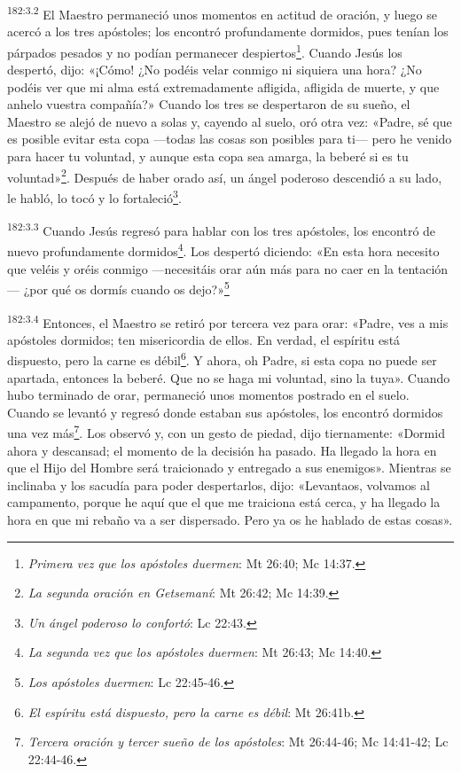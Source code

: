 \par
\textsuperscript{182:3.2} El Maestro permaneció unos momentos en actitud de oración, y luego se acercó a los tres apóstoles; los encontró profundamente dormidos, pues tenían los párpados pesados y no podían permanecer despiertos\footnote{\textit{Primera vez que los apóstoles duermen}: Mt 26:40; Mc 14:37.}. Cuando Jesús los despertó, dijo: «¡Cómo! ¿No podéis velar conmigo ni siquiera una hora? ¿No podéis ver que mi alma está extremadamente afligida, afligida de muerte, y que anhelo vuestra compañía?» Cuando los tres se despertaron de su sueño, el Maestro se alejó de nuevo a solas y, cayendo al suelo, oró otra vez: «Padre, sé que es posible evitar esta copa ---todas las cosas son posibles para ti--- pero he venido para hacer tu voluntad, y aunque esta copa sea amarga, la beberé si es tu voluntad»\footnote{\textit{La segunda oración en Getsemaní}: Mt 26:42; Mc 14:39.}. Después de haber orado así, un ángel poderoso descendió a su lado, le habló, lo tocó y lo fortaleció\footnote{\textit{Un ángel poderoso lo confortó}: Lc 22:43.}.

\par
\textsuperscript{182:3.3} Cuando Jesús regresó para hablar con los tres apóstoles, los encontró de nuevo profundamente dormidos\footnote{\textit{La segunda vez que los apóstoles duermen}: Mt 26:43; Mc 14:40.}. Los despertó diciendo: «En esta hora necesito que veléis y oréis conmigo ---necesitáis orar aún más para no caer en la tentación--- ¿por qué os dormís cuando os dejo?»\footnote{\textit{Los apóstoles duermen}: Lc 22:45-46.}

\par
\textsuperscript{182:3.4} Entonces, el Maestro se retiró por tercera vez para orar: «Padre, ves a mis apóstoles dormidos; ten misericordia de ellos. En verdad, el espíritu está dispuesto, pero la carne es débil\footnote{\textit{El espíritu está dispuesto, pero la carne es débil}: Mt 26:41b.}. Y ahora, oh Padre, si esta copa no puede ser apartada, entonces la beberé. Que no se haga mi voluntad, sino la tuya». Cuando hubo terminado de orar, permaneció unos momentos postrado en el suelo. Cuando se levantó y regresó donde estaban sus apóstoles, los encontró dormidos una vez más\footnote{\textit{Tercera oración y tercer sueño de los apóstoles}: Mt 26:44-46; Mc 14:41-42; Lc 22:44-46.}. Los observó y, con un gesto de piedad, dijo tiernamente: «Dormid ahora y descansad; el momento de la decisión ha pasado. Ha llegado la hora en que el Hijo del Hombre será traicionado y entregado a sus enemigos». Mientras se inclinaba y los sacudía para poder despertarlos, dijo: «Levantaos, volvamos al campamento, porque he aquí que el que me traiciona está cerca, y ha llegado la hora en que mi rebaño va a ser dispersado. Pero ya os he hablado de estas cosas».

